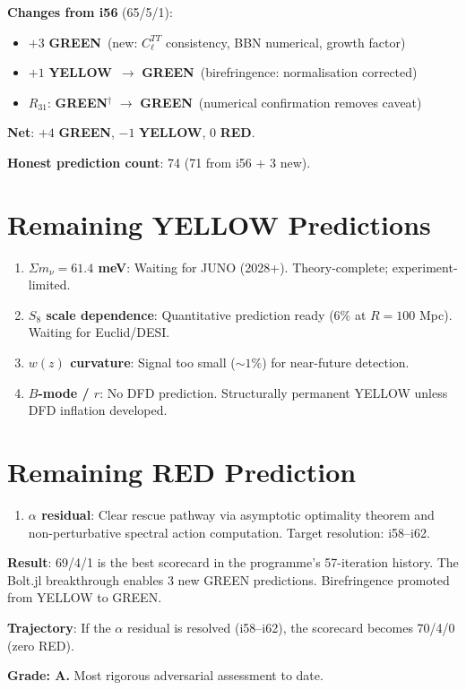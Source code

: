 \documentclass[11pt,a4paper]{article}
\newcommand{\GREEN}{\textcolor{dfdgreen}{\textbf{GREEN}}}
\newcommand{\YELLOW}{\textcolor{dfdyellow}{\textbf{YELLOW}}}
\newcommand{\RED}{\textcolor{dfdred}{\textbf{RED}}}
\begin{document}
\begin{tcolorbox}[colback=green!5!white, colframe=green!60!black, title={i57 SCORECARD: 69 GREEN / 4 YELLOW / 1 RED}]
\textbf{Changes from i56} (65/5/1):
\begin{itemize}
\item $+3$ \GREEN\ (new: $C_\ell^{TT}$ consistency, BBN numerical, growth factor)
\item $+1$ \YELLOW\ $\to$ \GREEN\ (birefringence: normalisation corrected)
\item $R_{31}$: \GREEN$^\dagger$ $\to$ \GREEN\ (numerical confirmation removes caveat)
\end{itemize}

\textbf{Net}: $+4$ \GREEN, $-1$ \YELLOW, $0$ \RED.

\textbf{Honest prediction count}: 74 (71 from i56 + 3 new).
\end{tcolorbox}

\section{Remaining YELLOW Predictions}

\begin{enumerate}
\item \textbf{$\Sigma m_\nu = 61.4$ meV}: Waiting for JUNO (2028+). Theory-complete; experiment-limited.
\item \textbf{$S_8$ scale dependence}: Quantitative prediction ready (6\% at $R = 100$ Mpc). Waiting for Euclid/DESI.
\item \textbf{$w(z)$ curvature}: Signal too small ($\sim 1\%$) for near-future detection.
\item \textbf{$B$-mode / $r$}: No DFD prediction. Structurally permanent YELLOW unless DFD inflation developed.
\end{enumerate}

\section{Remaining RED Prediction}

\begin{enumerate}
\item \textbf{$\alpha$ residual}: Clear rescue pathway via asymptotic optimality theorem and non-perturbative spectral action computation. Target resolution: i58--i62.
\end{enumerate}

\begin{tcolorbox}[colback=blue!5!white, colframe=blue!60!black, title={Agent 19: Adversarial Summary --- BEST SCORECARD EVER}]
\textbf{Result}: 69/4/1 is the best scorecard in the programme's 57-iteration history. The Bolt.jl breakthrough enables 3 new GREEN predictions. Birefringence promoted from YELLOW to GREEN.

\textbf{Trajectory}: If the $\alpha$ residual is resolved (i58--i62), the scorecard becomes 70/4/0 (zero RED).

\textbf{Grade: A.} Most rigorous adversarial assessment to date.
\end{tcolorbox}
\end{document}
